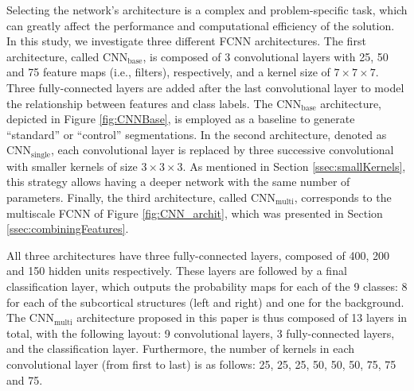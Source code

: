 \documentclass[twoside,fleqn,espcrc2]{elsarticle}
\newcommand{\CNNbase}{\mr{CNN}_\mr{base}}
\newcommand{\CNNsingle}{\mr{CNN}_\mr{single}}
\newcommand{\CNNmulti}{\mr{CNN}_\mr{multi}}
\newcommand{\mr}[1]{\mathrm{#1}}
\begin{document}
Selecting the network's architecture is a complex and problem-specific task, which can greatly affect the performance and computational efficiency of the solution. In this study, we investigate three different FCNN architectures. The first architecture, called $\CNNbase$, is composed of 3 convolutional layers with 25, 50 and 75 feature maps (i.e., filters), respectively, and a kernel size of $7\!\times\!7\!\times 7$. Three fully-connected layers are added after the last convolutional layer to model the relationship between features and class labels. The $\CNNbase$ architecture, depicted in Figure \ref{fig:CNNBase}, is employed as a baseline to generate ``standard'' or ``control'' segmentations. In the second architecture, denoted as $\CNNsingle$, each convolutional layer is replaced by three successive convolutional with smaller kernels of size $3\!\times\!3\!\times 3$. As mentioned in Section \ref{ssec:smallKernels}, this strategy allows having a deeper network with the same number of parameters. Finally, the third architecture, called $\CNNmulti$, corresponds to the multiscale FCNN of Figure \ref{fig:CNN_archit}, which was presented in Section \ref{ssec:combiningFeatures}.

All three architectures have three fully-connected layers, composed of 400, 200 and 150 hidden units respectively. These layers are followed by a final classification layer, which outputs the probability maps for each of the 9 classes: 8 for each of the subcortical structures (left and right) and one for the background. The $\CNNmulti$ architecture proposed in this paper is thus composed of 13 layers in total, with the following layout: 9 convolutional layers, 3 fully-connected layers, and the classification layer. Furthermore, the number of kernels in each convolutional layer (from first to last) is as follows: 25, 25, 25, 50, 50, 50, 75, 75 and 75.
\end{document}
